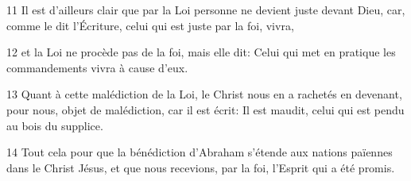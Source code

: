 
11 Il est d’ailleurs clair que par la Loi personne ne devient juste devant Dieu, car, comme le dit l’Écriture, celui qui est juste par la foi, vivra,

12 et la Loi ne procède pas de la foi, mais elle dit: Celui qui met en pratique les commandements vivra à cause d’eux.

13 Quant à cette malédiction de la Loi, le Christ nous en a rachetés en devenant, pour nous, objet de malédiction, car il est écrit: Il est maudit, celui qui est pendu au bois du supplice.

14 Tout cela pour que la bénédiction d’Abraham s’étende aux nations païennes dans le Christ Jésus, et que nous recevions, par la foi, l’Esprit qui a été promis.